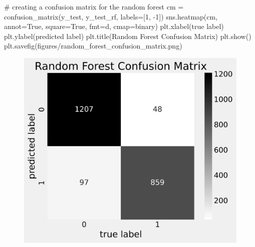 \documentclass[
  letterpaper,
  DIV=11,
  numbers=noendperiod]{scrartcl}
\newenvironment{Shaded}{\begin{snugshade}}{\end{snugshade}}
\newcommand{\CommentTok}[1]{\textcolor[rgb]{0.37,0.37,0.37}{#1}}
\newcommand{\DecValTok}[1]{\textcolor[rgb]{0.68,0.00,0.00}{#1}}
\newcommand{\NormalTok}[1]{\textcolor[rgb]{0.00,0.23,0.31}{#1}}
\newcommand{\OperatorTok}[1]{\textcolor[rgb]{0.37,0.37,0.37}{#1}}
\newcommand{\StringTok}[1]{\textcolor[rgb]{0.13,0.47,0.30}{#1}}
\newcommand{\VariableTok}[1]{\textcolor[rgb]{0.07,0.07,0.07}{#1}}
\begin{document}
\begin{Shaded}
\begin{Highlighting}[]
\CommentTok{\# creating a confusion matrix for the random forest}
\NormalTok{cm }\OperatorTok{=}\NormalTok{ confusion\_matrix(y\_test, y\_test\_rf, labels}\OperatorTok{=}\NormalTok{[}\DecValTok{1}\NormalTok{, }\OperatorTok{{-}}\DecValTok{1}\NormalTok{])}
\NormalTok{sns.heatmap(cm, annot}\OperatorTok{=}\VariableTok{True}\NormalTok{, square}\OperatorTok{=}\VariableTok{True}\NormalTok{, fmt}\OperatorTok{=}\StringTok{\textquotesingle{}d\textquotesingle{}}\NormalTok{, cmap}\OperatorTok{=}\StringTok{\textquotesingle{}binary\textquotesingle{}}\NormalTok{)}
\NormalTok{plt.xlabel(}\StringTok{\textquotesingle{}true label\textquotesingle{}}\NormalTok{)}
\NormalTok{plt.ylabel(}\StringTok{\textquotesingle{}predicted label\textquotesingle{}}\NormalTok{)}
\NormalTok{plt.title(}\StringTok{\textquotesingle{}Random Forest Confusion Matrix\textquotesingle{}}\NormalTok{)}
\NormalTok{plt.show()}
\NormalTok{plt.savefig(}\StringTok{\textquotesingle{}figures/random\_forest\_confusion\_matrix.png\textquotesingle{}}\NormalTok{)}
\end{Highlighting}
\end{Shaded}

\begin{figure}[H]

{\centering \includegraphics{project_files/figure-pdf/cell-27-output-1.svg}

}

\end{figure}
\end{document}
